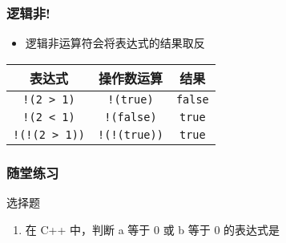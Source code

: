 \begin{frame}[fragile]
    \frametitle{逻辑非\enspace!}

    \begin{itemize}
        \item 逻辑非运算符会将表达式的结果取反
    \end{itemize}

    \begin{table}[]
        \begin{tabular}{ccc}
            \toprule
            表达式                  & 操作数运算             & 结果              \\
            \midrule
            \lstinline|!(2 > 1)|    & \lstinline|!(true)|    & \lstinline|false| \\
            \lstinline|!(2 < 1)|    & \lstinline|!(false)|   & \lstinline|true|  \\
            \lstinline|!(!(2 > 1))| & \lstinline|!(!(true))| & \lstinline|true|  \\
            \bottomrule
        \end{tabular}
    \end{table}
\end{frame}

\begin{frame}[fragile]
    \frametitle{随堂练习}

    \begin{exampleblock}{选择题}

        \begin{enumerate}
            \item 在 C++ 中，判断 a 等于 0 或 b 等于 0 的表达式是


        \end{enumerate}

    \end{exampleblock}
\end{frame}

